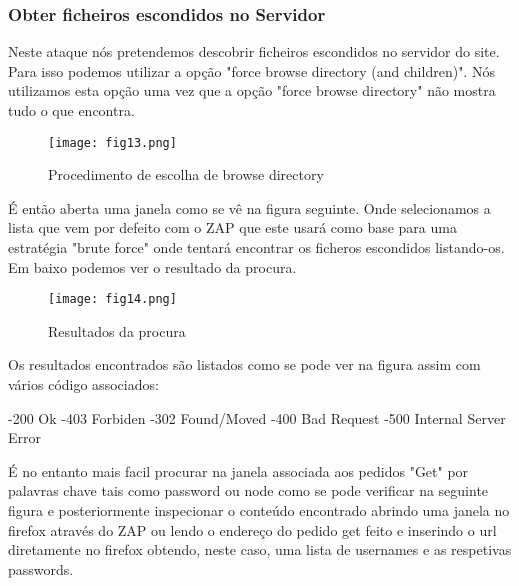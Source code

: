 




\subsubsection{Obter ficheiros escondidos no Servidor}

Neste ataque nós pretendemos descobrir ficheiros escondidos no servidor do site. Para isso podemos utilizar a opção "force browse directory (and children)". Nós utilizamos esta opção uma vez que a opção "force browse directory" não mostra tudo o que encontra.
\begin{figure}[H]

  \centering

  \texttt{[image: fig13.png]}

  \caption{Procedimento de escolha de browse directory}

\end{figure}

É então aberta uma janela como se vê na figura seguinte. Onde selecionamos a lista que vem por defeito com o ZAP que este usará como base para uma estratégia "brute force" onde tentará encontrar os ficheros escondidos listando-os. Em baixo podemos ver o resultado da procura.
\begin{figure}[H]

  \centering

  \texttt{[image: fig14.png]}

  \caption{Resultados da procura}

\end{figure}

Os resultados encontrados são listados como se pode ver na figura assim com vários código associados:

-200  Ok
-403  Forbiden
-302  Found/Moved
-400  Bad Request
-500  Internal Server Error


É no entanto mais facil procurar na janela associada aos pedidos "Get" por palavras chave tais como password ou node como se pode verificar na seguinte figura e posteriormente inspecionar o conteúdo encontrado abrindo uma janela no firefox através do ZAP ou lendo o endereço do pedido get feito e inserindo o url diretamente no firefox obtendo, neste caso, uma lista de usernames e as respetivas passwords.

